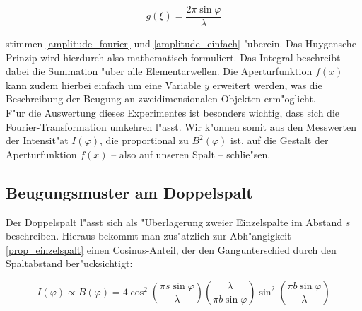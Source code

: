 		\begin{equation}
			g(\xi) = \frac{2 \pi \sin{\varphi}}{\lambda}
		\end{equation}

		stimmen \ref{amplitude_fourier} und \ref{amplitude_einfach} "uberein.
		Das Huygensche Prinzip wird hierdurch also mathematisch formuliert.
		Das Integral beschreibt dabei die Summation "uber alle Elementarwellen.
		Die Aperturfunktion $f(x)$ kann zudem hierbei einfach um eine Variable $y$ erweitert werden,
		was die Beschreibung der Beugung an zweidimensionalen Objekten erm"oglicht. \\
		F"ur die Auswertung dieses Experimentes ist besonders wichtig, dass sich die Fourier-Transformation umkehren l"asst.
		Wir k"onnen somit aus den Messwerten der Intensit"at $I(\varphi)$,
		die proportional zu $B^2(\varphi)$ ist, auf die Gestalt der Aperturfunktion $f(x)$
		--  also auf unseren Spalt -- schlie"sen.
		
	\subsection{Beugungsmuster am Doppelspalt}
		\label{sec:muster_doppelspalt}

		Der Doppelspalt l"asst sich als "Uberlagerung zweier Einzelspalte im Abstand $s$ beschreiben.
		Hieraus bekommt man zus"atzlich zur Abh"angigkeit \ref{prop_einzelspalt} einen Cosinus-Anteil,
		der den Gangunterschied durch den Spaltabstand ber"ucksichtigt:

		\begin{equation}
			I(\varphi) \propto B(\varphi) = 
			4 \cos^2{\left( \frac{\pi s \sin{\varphi}}{\lambda} \right)}
			\left( \frac{\lambda}{\pi b \sin{\varphi}} \right)
			\sin^2{\left( \frac{\pi b \sin{\varphi}}{\lambda} \right)}
			\label{prop_doppelspalt}
		\end{equation}
